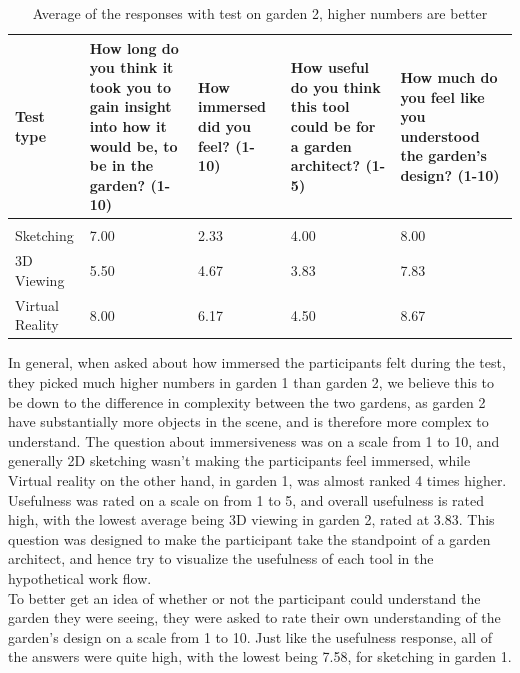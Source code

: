 \begin{table}[H]
	\centering
	\caption{Average of the responses with test on garden 2, higher numbers are better}
	\label{table:averageResponseGarden2}
	\begin{tabular}{p{3cm}|p{3cm}|p{2cm}|p{3cm}|p{3cm}}
		Test type       & How long do you think it took you to gain insight into how it would be, to be in the garden? (1-10) & How immersed did you feel? (1-10) & How useful do you think this tool could be for a garden architect? (1-5) & How much do you feel like you understood the garden's design? (1-10) \\ \hline
		&&&&\\
		Sketching       & 7.00                                                                                         & 2.33                       & 4.00                                                               & 8.00                                                          \\
		3D Viewing      & 5.50                                                                                         & 4.67                       & 3.83                                                               & 7.83                                                          \\
		
		Virtual Reality & 8.00                                                                                         & 6.17                       & 4.50                                                               & 8.67                                                         
	\end{tabular}
\end{table}

In general, when asked about how immersed the participants felt during the test, they picked much higher numbers in garden 1 than garden 2, we believe this to be down to the difference in complexity between the two gardens, as garden 2 have substantially more objects in the scene, and is therefore more complex to understand.
The question about immersiveness was on a scale from 1 to 10, and generally 2D sketching wasn't making the participants feel immersed, while Virtual reality on the other hand, in garden 1, was almost ranked 4 times higher.\\

Usefulness was rated on a scale on from 1 to 5, and overall usefulness is rated high, with the lowest average being 3D viewing in garden 2, rated at 3.83. This question was designed to make the participant take the standpoint of a garden architect, and hence try to visualize the usefulness of each tool in the hypothetical work flow.\\
To better get an idea of whether or not the participant could understand the garden they were seeing, they were asked to rate their own understanding of the garden's design on a scale from 1 to 10. Just like the usefulness response, all of the answers were quite high, with the lowest being 7.58, for sketching in garden 1.\\

